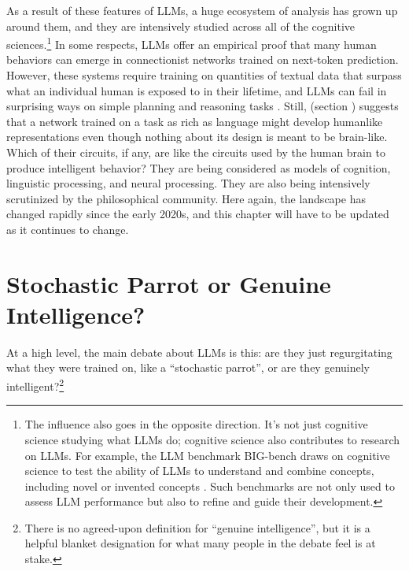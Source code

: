 As a result of these features of LLMs, a huge ecosystem of analysis has grown
up around them, and they are intensively studied across all of the cognitive
sciences.\footnote{The influence also goes in the opposite direction. It's not
just cognitive science studying what LLMs do; cognitive science also
contributes to research on LLMs. For example, the LLM benchmark BIG-bench draws
on cognitive science to test the ability of LLMs to understand and combine
concepts, including novel or invented concepts \cite{srivastava2022beyond}.
Such benchmarks are not only used to assess LLM performance but also to refine
and guide their development.} In some respects, LLMs offer an empirical proof
that many human behaviors can emerge in connectionist networks trained on
next-token prediction. However, these systems require training on quantities of
textual data that surpass what an individual human is exposed to in their
lifetime, and LLMs can fail in surprising ways on simple planning and reasoning
tasks \cite{momennejad2023cogeval}. Still,  (section
) suggests that a network trained on a task as rich as
language might develop humanlike representations even though nothing about its
design is meant to be brain-like. Which of their circuits, if any, are like the
circuits used by the human brain to produce intelligent behavior? They are
being considered as models of cognition, linguistic processing, and neural
processing. They are also being intensively scrutinized by the philosophical
community. Here again, the landscape has changed rapidly since the early 2020s,
and this chapter will have to be updated as it continues to change.

\section{Stochastic Parrot or Genuine Intelligence?}\label{stochasticParrot}

At a high level, the main debate about LLMs is this: are they just
regurgitating what they were trained on, like a ``stochastic parrot'', or are they
genuinely intelligent?\footnote{There is no agreed-upon definition for ``genuine intelligence'', but it is a helpful blanket designation for what many people in the debate feel is at stake.} 


